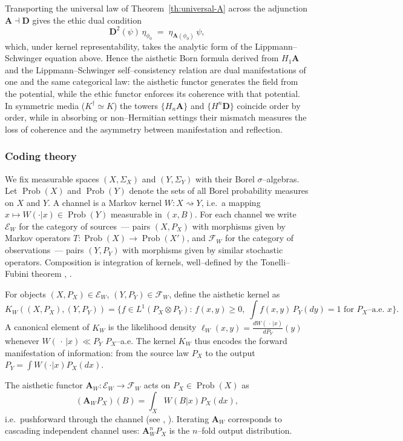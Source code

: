 \documentclass[12pt]{article}
\DeclareMathOperator{\Prob}{Prob}
\newcommand{\E}{\mathcal{E}}
\newcommand{\F}{\mathcal{F}}
\theoremstyle{plain}
\theoremstyle{definition}
\theoremstyle{remark}
\numberwithin{equation}{section}
\begin{document}
Transporting the universal law of Theorem~\ref{th:universal-A} across the adjunction $\mathbf A\dashv\mathbf D$ gives the ethic dual condition
\[
\mathbf D^2(\psi)\,\eta_{\phi_0}\;=\;\eta_{\mathbf A(\phi_0)}\,\psi,
\]
which, under kernel representability, takes the analytic form of the Lippmann--Schwinger equation above.  
Hence the aisthetic Born formula derived from $H_1\mathbf A$ and the Lippmann--Schwinger self--consistency relation are dual manifestations of one and the same categorical law: the aisthetic functor generates the field from the potential, while the ethic functor enforces its coherence with that potential.  
In symmetric media (\(K^\dagger\simeq K\)) the towers $\{H_n\mathbf A\}$ and $\{H^n\mathbf D\}$ coincide order by order, while in absorbing or non--Hermitian settings their mismatch measures the loss of coherence and the asymmetry between manifestation and reflection.

\subsubsection{Coding theory}

We fix measurable spaces $(X,\Sigma_X)$ and $(Y,\Sigma_Y)$ with their Borel $\sigma$--algebras.  
Let $\Prob(X)$ and $\Prob(Y)$ denote the sets of all Borel probability measures on $X$ and $Y$.  
A channel is a Markov kernel $W:X\rightsquigarrow Y$, i.e.\ a mapping $x\mapsto W(\cdot|x)\in\Prob(Y)$ measurable in $(x,B)$.  
For each channel we write $\E_W$ for the category of sources~--- pairs $(X,P_X)$ with morphisms given by Markov operators $T:\Prob(X)\to\Prob(X')$, and $\F_W$ for the category of observations~--- pairs $(Y,P_Y)$ with morphisms given by similar stochastic operators.  
Composition is integration of kernels, well--defined by the Tonelli--Fubini theorem \cite{Bogachev2007}, \cite{Kallenberg2002}.  
 
For objects $(X,P_X)\in\E_W$, $(Y,P_Y)\in\F_W$, define the aisthetic kernel as
\[
K_W((X,P_X),(Y,P_Y))
=\big\{f\in L^1(P_X\!\otimes\!P_Y):\, f(x,y)\ge 0,\;
\int f(x,y)\,P_Y(dy)=1\text{ for $P_X$--a.e.\ $x$}\big\}.
\]
A canonical element of $K_W$ is the likelihood density $\ell_W(x,y)=\frac{dW(\,\cdot\,|x)}{dP_Y}(y)$ whenever $W(\,\cdot\,|x)\ll P_Y$ $P_X$--a.e.  
The kernel $K_W$ thus encodes the forward manifestation of information: from the source law $P_X$ to the output $P_Y=\int W(\cdot|x)P_X(dx)$.

The aisthetic functor $\mathbf A_W:\E_W\to\F_W$ acts on $P_X\in\Prob(X)$ as
\[
(\mathbf A_WP_X)(B)=\int_X W(B|x)P_X(dx),
\]
i.e.\ pushforward through the channel (see \cite{CsiszarKorner2011}, \cite{Gray2011}).  
Iterating $\mathbf A_W$ corresponds to cascading independent channel uses: $\mathbf A_W^nP_X$ is the $n$--fold output distribution.
\end{document}
